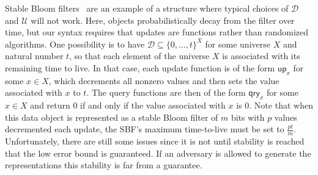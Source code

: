 \documentclass[11pt, pdftex]{article}
\begin{document}
Stable Bloom filters~\cite{xxx} are an example of a structure where typical choices of $\mathcal{D}$ and $\mathcal{U}$ will not work. Here, objects probabilistically decay from the filter over time, but our syntax requires that updates are functions rather than randomized algorithms.  One possibility is to have $\mathcal{D} \subseteq \{0,\ldots,t\}^X$ for some universe $X$ and natural number $t$, so that each element of the universe $X$ is associated with its remaining time to live.   In that case, each update function is of the form $\mathsf{up}_x$ for some $x \in X$, which decrements all nonzero values and then sets the value associated with $x$ to $t$. The query functions are then of the form $\mathsf{qry}_x$ for some $x \in X$ and return 0 if and only if the value associated with $x$ is 0. Note that when this data object is represented as a stable Bloom filter of $m$ bits with $p$ values decremented each update, the SBF's maximum time-to-live must be set to $\frac{pt}{m}$. Unfortunately, there are still some issues since it is not until stability is reached that the low error bound is guaranteed. If an adversary is allowed to generate the representations this stability is far from a guarantee.
\end{document}
